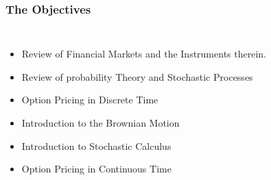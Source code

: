 \documentclass{beamer}
\begin{document}
\begin{frame}
\frametitle{The Objectives}
	\begin{columns}[c]	
	
	\begin{itemize}
		\item <1-| alert@1> Review of Financial Markets and the Instruments therein.
		\item <2-| alert@2> Review of probability Theory and Stochastic Processes
		\item <3-| alert@3> Option Pricing in Discrete Time
		\item <4-| alert@4> Introduction to the Brownian Motion
		\item <5-| alert@5> Introduction to Stochastic Calculus
		\item <6-| alert@6> Option Pricing in Continuous Time
	\end{itemize}
	
	

\end{columns}
\end{frame}
\end{document}
